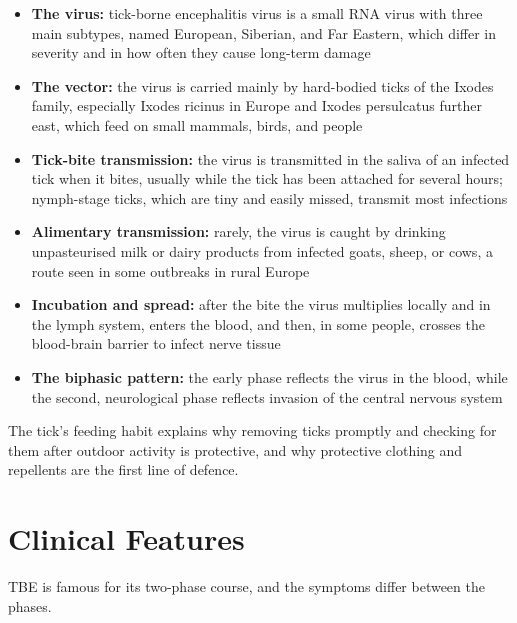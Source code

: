 \begin{itemize}
    \item \textbf{The virus:} tick-borne encephalitis virus is a small RNA virus with three main subtypes, named European, Siberian, and Far Eastern, which differ in severity and in how often they cause long-term damage
    \item \textbf{The vector:} the virus is carried mainly by hard-bodied ticks of the Ixodes family, especially Ixodes ricinus in Europe and Ixodes persulcatus further east, which feed on small mammals, birds, and people
    \item \textbf{Tick-bite transmission:} the virus is transmitted in the saliva of an infected tick when it bites, usually while the tick has been attached for several hours; nymph-stage ticks, which are tiny and easily missed, transmit most infections
    \item \textbf{Alimentary transmission:} rarely, the virus is caught by drinking unpasteurised milk or dairy products from infected goats, sheep, or cows, a route seen in some outbreaks in rural Europe
    \item \textbf{Incubation and spread:} after the bite the virus multiplies locally and in the lymph system, enters the blood, and then, in some people, crosses the blood-brain barrier to infect nerve tissue
    \item \textbf{The biphasic pattern:} the early phase reflects the virus in the blood, while the second, neurological phase reflects invasion of the central nervous system
\end{itemize}

The tick's feeding habit explains why removing ticks promptly and checking for them after outdoor activity is protective, and why protective clothing and repellents are the first line of defence.

\section*{Clinical Features}
TBE is famous for its two-phase course, and the symptoms differ between the phases.


